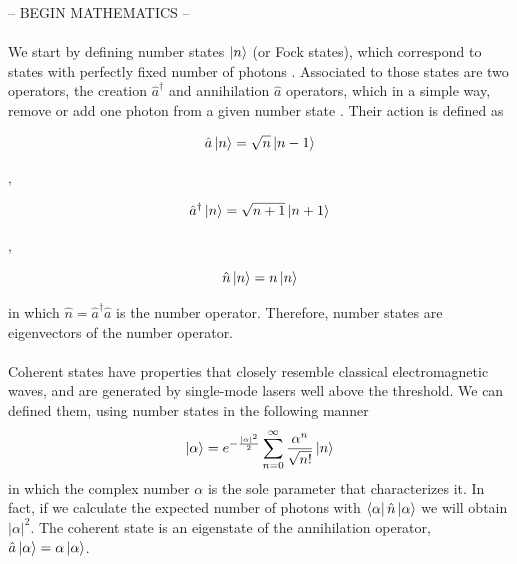 \begin{bibunit}[plain]
-- BEGIN MATHEMATICS --\\
\\
We start by defining number states $\ket{n}$ (or Fock states), which correspond to states with perfectly fixed number of photons
\cite{loudon2000}.
Associated to those states are two operators, the creation $\hat{a}^\dagger$ and annihilation $\hat{a}$ operators, which in a simple way, remove or add one photon from a given number state
\cite{fox2006}.
Their action is defined as
%
\begin{center}
	\hspace{-4mm}
	\begin{minipage}{44mm}
		\noindent
		\begin{equation}
			\hat{a} \ket{n} = \sqrt{n} \ket{n-1}
		\end{equation}
	\end{minipage}
	$,\quad$
	\begin{minipage}{52mm}
		\noindent
		\begin{equation}
			\hat{a}^\dagger \ket{n} = \sqrt{n+1} \ket{n+1}
		\end{equation}
	\end{minipage}
	$,\quad$
	\begin{minipage}{35mm}
		\noindent
		\begin{equation}
			\hat{n} \ket{n} = n \ket{n}
		\end{equation}
	\end{minipage}
\end{center}
%
in which $\hat{n} = \hat{a}^\dagger\hat{a}$ is the number operator. Therefore, number states are eigenvectors of the number operator.\\
\\
Coherent states have properties that closely resemble classical electromagnetic waves, and are generated by single-mode lasers well above the threshold.
\cite{loudon2000}
We can defined them, using number states in the following manner
\begin{equation}
\ket{\alpha} = e^{-\frac{|\alpha|^2}{2}} \sum_{n=0}^\infty \frac{\alpha^n}{\sqrt{n!}} \ket{n}
\end{equation}
in which the complex number $\alpha$ is the sole parameter that characterizes it.
In fact, if we calculate the expected number of photons with $\bra{\alpha} \hat{n} \ket{\alpha}$ we will obtain $|\alpha|^2$. The coherent state is an eigenstate of the annihilation operator, $\hat{a}\ket{\alpha} = \alpha \ket{\alpha}$.\\

\end{bibunit}
